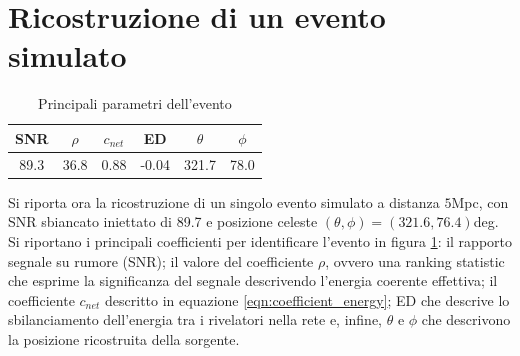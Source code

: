 \section{Ricostruzione di un evento simulato}
\label{subsection:APR4}
\begin{table}
	\vspace{-8pt}
	\begin{tabular}{cccccc}
		\toprule
		SNR	&$\rho$	&$c_{net}$	&ED	&$\theta$	&$\phi$	\\
		\midrule
		89.3	&36.8	&0.88	&-0.04	&321.7	&78.0	\\
		\bottomrule
	\end{tabular}
	\caption{Principali parametri dell'evento}
	\label{tab:parametri}
	\vspace{-10pt}
\end{table}
Si riporta ora la ricostruzione di un singolo evento simulato a distanza $5$Mpc, con SNR sbiancato iniettato di 89.7 e posizione celeste $(\theta,\phi)=(321.6, 76.4)$deg.
Si riportano i principali coefficienti per identificare l'evento in figura \ref{tab:parametri}: il rapporto segnale su rumore (SNR); il valore del coefficiente $\rho$, ovvero una ranking statistic che esprime la significanza del segnale descrivendo l'energia coerente effettiva; il coefficiente $c_{net}$ descritto in equazione \ref{eqn:coefficient_energy}; ED che descrive lo sbilanciamento dell'energia tra i rivelatori nella rete e, infine, $\theta$ e $\phi$ che descrivono la posizione ricostruita della sorgente.
